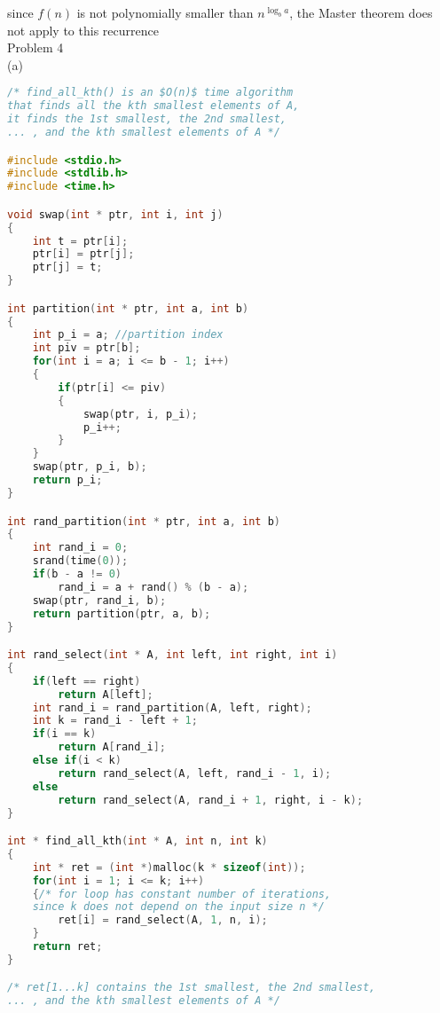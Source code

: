 \documentclass[12pt,border=4pt,multi]{article}%
\begin{document}
since $f(n)$ is not polynomially smaller than $n^{\log_b a}$, the Master theorem does not apply to this recurrence\\
\newpage
\noindent
Problem 4\\
(a)
\begin{lstlisting}[language = c, mathescape = true]
/* find_all_kth() is an $O(n)$ time algorithm
that finds all the kth smallest elements of A,
it finds the 1st smallest, the 2nd smallest,
... , and the kth smallest elements of A */

#include <stdio.h>
#include <stdlib.h>
#include <time.h>

void swap(int * ptr, int i, int j)
{
    int t = ptr[i];
    ptr[i] = ptr[j];
    ptr[j] = t;
}

int partition(int * ptr, int a, int b)
{
    int p_i = a; //partition index
    int piv = ptr[b];
    for(int i = a; i <= b - 1; i++)
    {
        if(ptr[i] <= piv)
        {
            swap(ptr, i, p_i);
            p_i++;
        }
    }
    swap(ptr, p_i, b);
    return p_i; 
}

int rand_partition(int * ptr, int a, int b)
{
    int rand_i = 0;
    srand(time(0));
    if(b - a != 0) 
        rand_i = a + rand() % (b - a);
    swap(ptr, rand_i, b);
    return partition(ptr, a, b);
}

int rand_select(int * A, int left, int right, int i)
{
    if(left == right)
        return A[left];
    int rand_i = rand_partition(A, left, right);
    int k = rand_i - left + 1;
    if(i == k)
        return A[rand_i];
    else if(i < k)
        return rand_select(A, left, rand_i - 1, i);
    else
        return rand_select(A, rand_i + 1, right, i - k);
}

int * find_all_kth(int * A, int n, int k)
{
    int * ret = (int *)malloc(k * sizeof(int));
    for(int i = 1; i <= k; i++) 
    {/* for loop has constant number of iterations, 
    since k does not depend on the input size n */
        ret[i] = rand_select(A, 1, n, i);
    }
    return ret;
}

/* ret[1...k] contains the 1st smallest, the 2nd smallest,
... , and the kth smallest elements of A */
\end{lstlisting}
\leavevmode
\newpage
\noindent
\end{document}
